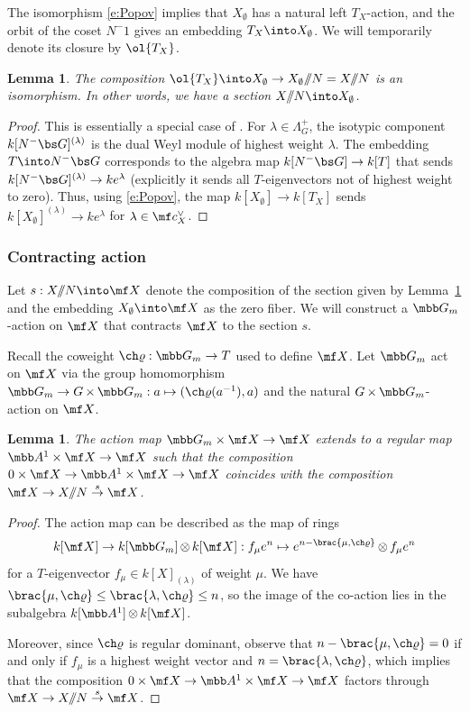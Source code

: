 \documentclass[final]{amsart}
\newtheorem{lem}[subsubsection]{Lemma}
\theoremstyle{remark}
\theoremstyle{definition}
\DeclareMathOperator*{\ot}{\otimes}
\DeclareMathOperator*{\xt}{\times}
\numberwithin{equation}{section}
\begin{document}
\medskip

The isomorphism \eqref{e:Popov} implies that $X_\emptyset$ has a natural left $T_X$-action, 
and the orbit of the coset $N^- 1$ gives an embedding 
$T_X \into X_\emptyset$. 
We will temporarily denote its closure by $\ol{T_X}$.
\begin{lem}  \label{lem:sectionX}
The composition $\ol{T_X} \into X_\emptyset \to X_\emptyset/\!\!/N = X/\!\!/N$ is an 
isomorphism. In other words, we have a section
$X/\!\!/N \into X_\emptyset$. 
\end{lem}
\begin{proof}
This is essentially a special case of \cite[Proposition 7]{AT}.
For $\lambda \in \Lambda_G^+$, the
isotypic component $k[N^-\bs G]^{(\lambda)}$ is the dual Weyl module
of highest weight $\lambda$. The embedding $T \into N^-\bs G$ 
corresponds to the algebra map 
$k[N^-\bs G] \to k[T]$ that sends $k[N^-\bs G]^{(\lambda)} \to k e^\lambda$ (explicitly it sends all $T$-eigenvectors not of highest weight to zero). 
Thus, using \eqref{e:Popov}, the map $k[X_\emptyset]\to k[T_X]$ 
sends $k[X_\emptyset]^{(\lambda)} \to k e^\lambda$ for $\lambda \in \mf c_X^\vee$.
\end{proof}

\subsubsection{Contracting action} 
Let $s : X/\!\!/N\into \mf X$
denote the composition of the section given by Lemma~\ref{lem:sectionX} and the embedding
$X_\emptyset \into \mf X$ as the zero fiber.
We will construct a $\mbb G_m$-action on $\mf X$ that 
contracts $\mf X$ to the section $s$.

Recall the coweight $\ch\varrho: \mbb G_m \to T$ used to define $\mf X$. 
Let $\mbb G_m$ act on $\mf X$ via the group homomorphism 
$\mbb G_m \to G \xt \mbb G_m : a \mapsto (\ch\varrho(a^{-1}), a)$ and the
natural $G\xt \mbb G_m$-action on $\mf X$. 

\begin{lem} \label{lem:contraction}
The action map $\mbb G_m \times \mf X \to \mf X$ extends to a regular map 
$\mbb A^1 \times \mf X \to \mf X$ such that the composition $0 \times \mf X \to \mbb A^1 \times \mf X \to \mf X$ coincides with the composition $\mf X \to X/\!\!/N \overset{s}\to \mf X$.
\end{lem}
\begin{proof}
The action map can be described as the map of rings 
\[ k[\mf X] \to k[\mbb G_m] \ot k[\mf X] : f_\mu e^n \mapsto 
e^{n-\brac{\mu,\ch\varrho}} \ot f_\mu e^n  \]
for a $T$-eigenvector $f_\mu \in k[X]_{(\lambda)}$ of weight $\mu$. 
We have $\brac{\mu,\ch\varrho} \le \brac{\lambda,\ch\varrho} \le n$,
so the image of the co-action lies in the subalgebra 
$k[\mbb A^1] \ot k[\mf X]$. 

Moreover, since $\ch\varrho$ is regular dominant, observe that $n-\brac{\mu,\ch\varrho}=0$ 
if and only if $f_\mu$ is a highest weight vector 
and $n=\brac{\lambda,\ch\varrho}$, 
which implies that the composition $0\times \mf X \to \mbb A^1 \times \mf X \to \mf X$ 
factors through $\mf X \to X/\!\!/N \overset s \to \mf X$.
\end{proof}
\end{document}
